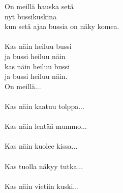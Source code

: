 
            On meillä hauska setä \\
            nyt bussikuskina \\
            kun setä ajaa bussia on näky komea. \\
\hspace{10mm} \\
            Kas näin heiluu bussi \\
            ja bussi heiluu näin \\
            kas näin heiluu bussi \\
            ja bussi heiluu näin. \\
            On meillä... \\
\hspace{10mm} \\
            Kas näin kaatuu tolppa... \\
\hspace{10mm} \\
            Kas näin lentää mummo... \\
\hspace{10mm} \\
            Kas näin kuolee kissa... \\
\hspace{10mm} \\
            Kas tuolla näkyy tutka... \\
\hspace{10mm} \\
            Kas näin vietiin kuski... \\
